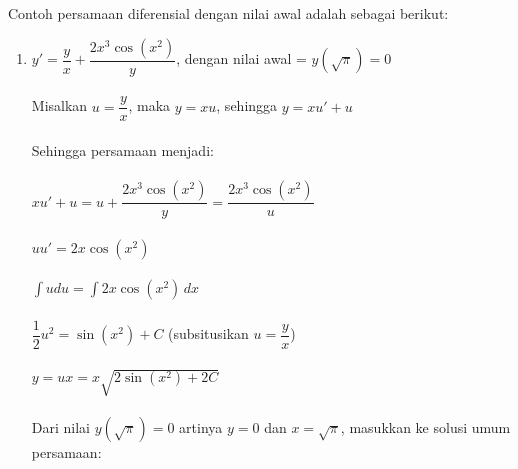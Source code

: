 Contoh persamaan diferensial dengan nilai awal adalah sebagai berikut:

\begin{enumerate}[1.]

	\item \begin{math} y' = \dfrac{y}{x} + \dfrac{2x^{3} \cos (x^{2})}{y} \end{math}, dengan nilai awal = \begin{math} y(\sqrt{\pi}) = 0 \end{math} \\ \\
	Misalkan \begin{math} u = \dfrac{y}{x} \end{math}, maka \begin{math} y = xu \end{math}, sehingga \begin{math} y = xu' + u \end{math} \\ \\
	Sehingga persamaan menjadi: \\ \\
	\begin{math} xu' + u = u + \dfrac{2x^{3} \cos (x^{2})}{y} =  \dfrac{2x^{3} \cos (x^{2})}{u} \end{math} \\ \\
	\begin{math} uu' = 2x \cos(x^{2}) \end{math} \\ \\
	\begin{math} \int u du = \int 2x \cos(x^{2}) \, dx \end{math} \\ \\
	\begin{math} \dfrac{1}{2} u^{2} = \sin (x^{2}) + C \end{math} (subsitusikan \begin{math} u = \dfrac{y}{x} \end{math}) \\ \\
	\begin{math} y = ux = x \sqrt{2 \sin(x^{2}) + 2C} \end{math} \\ \\
	Dari nilai \begin{math} y(\sqrt{\pi}) = 0 \end{math} artinya \begin{math} y = 0 \end{math} dan \begin{math} x = \sqrt{\pi} \end{math}, masukkan ke solusi umum persamaan: \\ \\

\end{enumerate}
